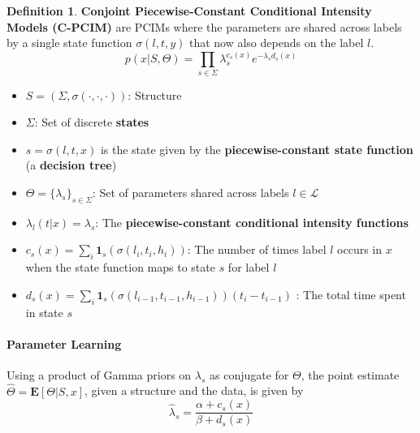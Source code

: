\documentclass[12pt]{article}
\theoremstyle{plain}
\theoremstyle{definition}
\newtheorem{definition}{Definition}
\theoremstyle{remark}
\begin{document}
\begin{definition}
  \textbf{Conjoint Piecewise-Constant Conditional Intensity Models (C-PCIM)} are
  PCIMs where the parameters are shared across labels by a single state function
  $\sigma(l,t,y)$ that now also depends on the label $l$.
  \begin{equation*}
    p(x|S,\Theta) = \prod_{s\in\Sigma}\lambda_{s}^{c_{s}(x)}
    e^{-\lambda_{s}d_{s}(x)}
  \end{equation*}
  \begin{itemize}
    \item $S=\left(\Sigma,\sigma(\cdot,\cdot,\cdot)\right)$: Structure
    \item $\Sigma$: Set of discrete \textbf{states}
    \item $s=\sigma(l,t,x)$ is the state given by the
      \textbf{piecewise-constant state function} (a \textbf{decision tree})
    \item $\Theta=\{\lambda_s\}_{s\in\Sigma}$: Set of parameters shared across
      labels $l \in \mathcal{L}$
    \item $\lambda_l(t|x)=\lambda_{s}$:
      The \textbf{piecewise-constant conditional intensity functions}
    \item $c_{s}(x)= \sum_i\mathbf{1}_s(\sigma(l_i,t_i,h_i))$:
      The number of times label $l$ occurs in $x$ when the state function maps
      to state $s$ for label $l$
    \item $d_{s}(x) = \sum_{i}\mathbf{1}_s(\sigma(l_{i-1},t_{i-1},h_{i-1}))(t_i-t_{i-1})$
      : The total time spent in state $s$
  \end{itemize}
\end{definition}

\paragraph{Parameter Learning}
Using a product of Gamma priors on $\lambda_s$ as conjugate for $\Theta$,
the point estimate $\hat{\Theta} = \mathbf{E}[\Theta|S,x]$, given a structure
and the data, is given by
\begin{equation*}
  \hat{\lambda}_s = \frac{\alpha + c_s(x)}{\beta + d_s(x)}
\end{equation*}
\end{document}

